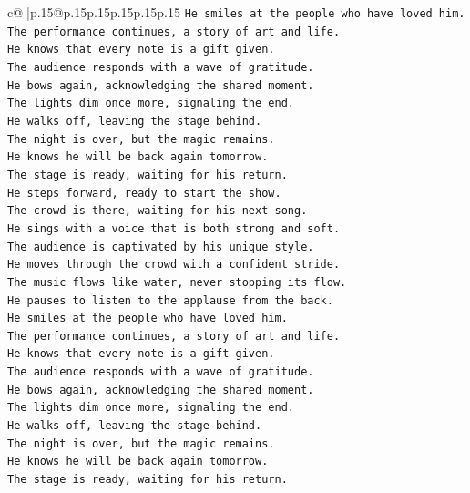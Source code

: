 \documentclass{article}
\begin{document}
{\begin{supertabular}{c@{$\;$}|p{.15\linewidth}@{}p{.15\linewidth}p{.15\linewidth}p{.15\linewidth}p{.15\linewidth}p{.15\linewidth}}
{{{\texttt{He smiles at the people who have loved him.} \\
\texttt{The performance continues, a story of art and life.} \\
\texttt{He knows that every note is a gift given.} \\
\texttt{The audience responds with a wave of gratitude.} \\
\texttt{He bows again, acknowledging the shared moment.} \\
\texttt{The lights dim once more, signaling the end.} \\
\texttt{He walks off, leaving the stage behind.} \\
\texttt{The night is over, but the magic remains.} \\
\texttt{He knows he will be back again tomorrow.} \\
\texttt{The stage is ready, waiting for his return.} \\
\texttt{He steps forward, ready to start the show.} \\
\texttt{The crowd is there, waiting for his next song.} \\
\texttt{He sings with a voice that is both strong and soft.} \\
\texttt{The audience is captivated by his unique style.} \\
\texttt{He moves through the crowd with a confident stride.} \\
\texttt{The music flows like water, never stopping its flow.} \\
\texttt{He pauses to listen to the applause from the back.} \\
\texttt{He smiles at the people who have loved him.} \\
\texttt{The performance continues, a story of art and life.} \\
\texttt{He knows that every note is a gift given.} \\
\texttt{The audience responds with a wave of gratitude.} \\
\texttt{He bows again, acknowledging the shared moment.} \\
\texttt{The lights dim once more, signaling the end.} \\
\texttt{He walks off, leaving the stage behind.} \\
\texttt{The night is over, but the magic remains.} \\
\texttt{He knows he will be back again tomorrow.} \\
\texttt{The stage is ready, waiting for his return.} \\
}}}
\end{supertabular}}
\end{document}
